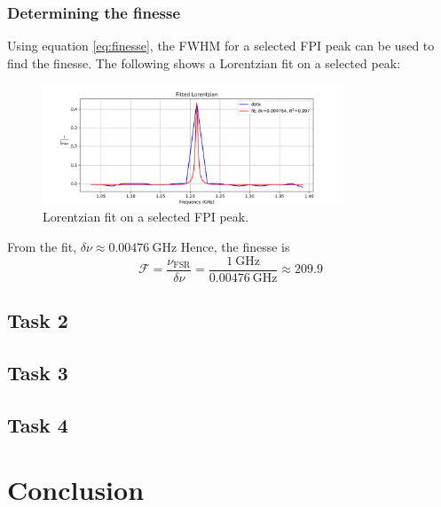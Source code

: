 \documentclass{article}
\begin{document}
\pagebreak{}

\subsubsection{Determining the finesse}

Using equation \ref{eq:finesse}, the FWHM for a selected FPI peak can be used to find the finesse. The following shows a Lorentzian fit on a selected peak:

\begin{figure}[h]
	\centering
	\includegraphics[width=0.8\textwidth]{Figures/FPI_Fit.png}
	\caption{Lorentzian fit on a selected FPI peak.}
	\label{fig:lorentzian_fit}
\end{figure}

From the fit, $\delta \nu \approx 0.00476 \ \text{GHz}$ Hence, the finesse is \[ \mathscr{F} = \frac{\nu_{\text{FSR}}}{\delta \nu} = \frac{1 \ \text{GHz}}{0.00476 \ \text{GHz}} \approx 209.9\]

\pagebreak{}

\subsection{Task 2}

\pagebreak{}

\subsection{Task 3}

\pagebreak{}

\subsection{Task 4}

\pagebreak{}

\section{Conclusion}

\pagebreak{}

\begin{appendices}


\end{appendices}

\pagebreak{}

 
 
\end{document}
